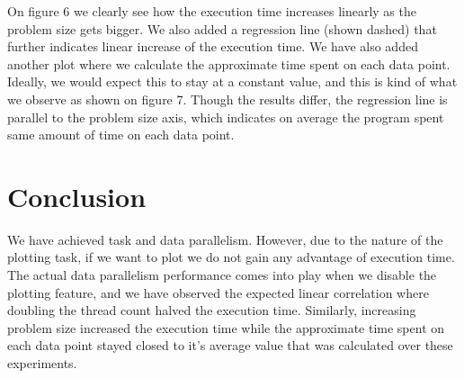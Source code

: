 \documentclass[11pt,reqno]{amsart}
\begin{document}
On figure 6 we clearly see how the execution time increases linearly as the problem size gets bigger. We also added a regression line (shown dashed) that further indicates linear increase of the execution time. We have also added another plot where we calculate the approximate time spent on each data point. Ideally, we would expect this to stay at a constant value, and this is kind of what we observe as shown on figure 7. Though the results differ, the regression line is parallel to the problem size axis, which indicates on average the program spent same amount of time on each data point. 

\section{Conclusion}

We have achieved task and data parallelism. However, due to the nature of the plotting task, if we want to plot we do not gain any advantage of execution time. The actual data parallelism performance comes into play when we disable the plotting feature, and we have observed the expected linear correlation where doubling the thread count halved the execution time. Similarly, increasing problem size increased the execution time while the approximate time spent on each data point stayed closed to it's average value that was calculated over these experiments.
\end{document}
